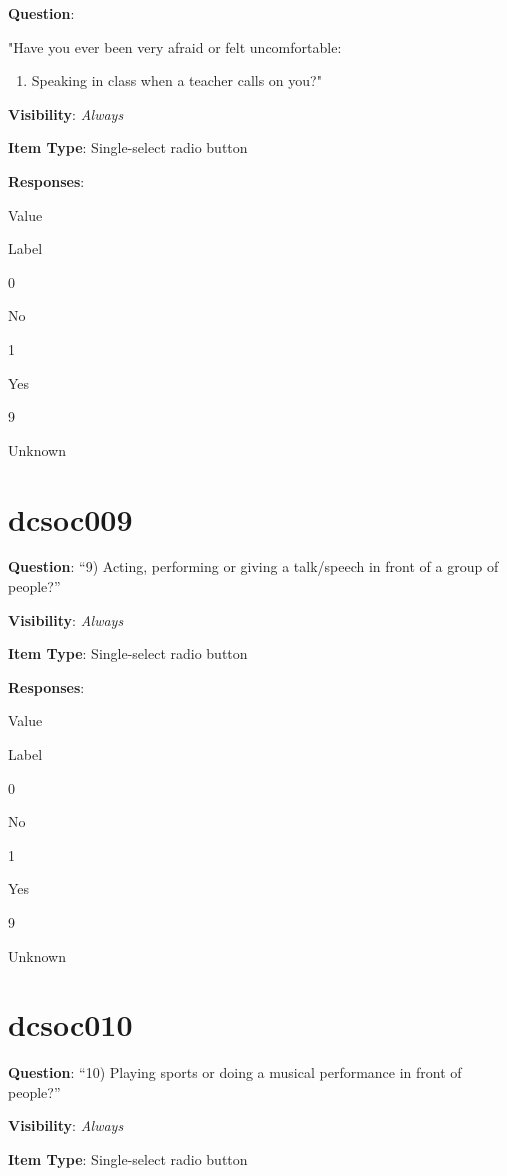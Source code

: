 \documentclass[]{book}
\providecommand{\tightlist}{%
  \setlength{\itemsep}{0pt}\setlength{\parskip}{0pt}}
\begin{document}
\textbf{Question}:

"Have you ever been very afraid or felt uncomfortable:

\begin{enumerate}
\def\labelenumi{\arabic{enumi})}
\setcounter{enumi}{7}
\tightlist
\item
  Speaking in class when a teacher calls on you?"
\end{enumerate}

\textbf{Visibility}: \emph{Always}

\textbf{Item Type}: Single-select radio button

\textbf{Responses}:

Value

Label

0

No

1

Yes

9

Unknown

\hypertarget{dcsoc009}{%
\section{dcsoc009}\label{dcsoc009}}

\textbf{Question}: ``9) Acting, performing or giving a talk/speech in front of a group of people?''

\textbf{Visibility}: \emph{Always}

\textbf{Item Type}: Single-select radio button

\textbf{Responses}:

Value

Label

0

No

1

Yes

9

Unknown

\hypertarget{dcsoc010}{%
\section{dcsoc010}\label{dcsoc010}}

\textbf{Question}: ``10) Playing sports or doing a musical performance in front of people?''

\textbf{Visibility}: \emph{Always}

\textbf{Item Type}: Single-select radio button
\end{document}
